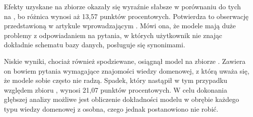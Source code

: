 Efekty uzyskane na zbiorze  okazały się wyraźnie słabsze w porównaniu do tych na , bo różnica wynosi aż 13,57 punktów procentowych. Potwierdza to obserwację przedstawioną w artykule wprowadzającym . Mówi ona, że modele mają duże problemy z odpowiadaniem na pytania, w których użytkownik nie znając dokładnie schematu bazy danych, posługuje się synonimami.

Niskie wyniki, chociaż również spodziewane, osiągnął model na zbiorze . Zawiera on bowiem pytania wymagające znajomości wiedzy domenowej, z którą uważa się, że modele sobie często nie radzą. Spadek, który nastąpił w tym przypadku względem zbioru , wynosi 21,07 punktów procentowych. W celu dokonania głębszej analizy możliwe jest obliczenie dokładności modelu w obrębie każdego typu wiedzy domenowej z osobna, czego jednak postanowiono nie robić.